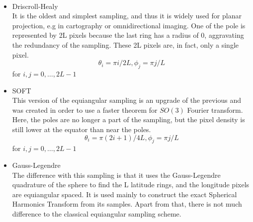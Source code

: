\documentclass[11pt]{report}
\begin{document}
\begin{description}
    \paragraph*{}
    \begin{minipage}{0.7\linewidth}
            \begin{itemize}
            \setlength\itemsep{0.5em}
                \item Driscroll-Healy \cite{driscoll_computing_1994}\\
                It is the oldest and simplest sampling, and thus it is widely used for planar projection, e.g in cartography or omnidirectional imaging.
                One of the pole is represented by 2L pixels because the last ring has a radius of 0, aggravating the redundancy of the sampling. These 2L pixels are, in fact, only a single pixel.
                $$\theta_i = \pi i/2L, \phi_j = \pi j/L$$
                for $i,j = 0, \ldots, 2L-1$
                \item SOFT \cite{healy_ffts_2003}\\
                This version of the equiangular sampling is an upgrade of the previous and was created in order to use a faster theorem for $SO(3)$ Fourier transform.
                Here, the poles are no longer a part of the sampling, but the pixel density is still lower at the equator than near the poles.
                $$\theta_i = \pi (2i+1)/4L, \phi_j = \pi j/L$$
                for $i,j = 0, \ldots, 2L-1$
                \item Gauss-Legendre \cite{keiner_fast_2008}\\
                The difference with this sampling is that it uses the Gauss-Legendre quadrature of the sphere to find the L latitude rings, and the longitude pixels are equiangular spaced. It is used mainly to construct the exact Spherical Harmonics Transform from its samples.
                Apart from that, there is not much difference to the classical equiangular sampling scheme.
            \end{itemize}

\end{minipage}
\end{description}
\end{document}
